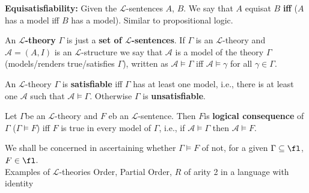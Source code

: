 \begin{definition}
	\textbf{Equisatisfiability:} Given the $\mathcal{L}$-sentences $A$, $B$. We say that $A$ equisat $B$ \textbf{iff} ($A$ has a model iff $B$ has a model). Similar to propositional logic.
\end{definition}

\begin{definition}
	An \textbf{$\mathcal{L}$-theory} $\Gamma$ is just a \textbf{set of $\mathcal{L}$-sentences}. If $\Gamma$ is an $\mathcal{L}$-theory and $\mathcal{A} = (A,I)$ is an $\mathcal{L}$-structure we say that $\mathcal{A}$ is a model of the theory $\Gamma$ (models/renders true/satisfies $\Gamma$), written as $\mathcal{A} \models \Gamma$ iff $\mathcal{A} \models \gamma$ for all $\gamma \in \Gamma$.
\end{definition}

\begin{definition}
	An $\mathcal{L}$-theory $\Gamma$ is \textbf{satisfiable} iff $\Gamma$ has at least one model, i.e., there is at least one $\mathcal{A}$ such that $\mathcal{A} \models \Gamma$. Otherwise $\Gamma$ is \textbf{unsatisfiable}.
\end{definition}

\begin{definition}
	Let $\Gamma$be an $\mathcal{L}$-theory and $F$ eb an $\mathcal{L}$-sentence. Then $F$is \textbf{logical consequence} of $\Gamma$ ($\Gamma \models F$) iff $F$ is true in every model of $\Gamma$, i.e., if $\mathcal{A} \models \Gamma$ then $\mathcal{A} \models F$.
\end{definition}

\noindent
We shall be concerned in ascertaining whether $\Gamma \models F$ of not, for a given $\Gamma \subseteq \fl$, $F \in \fl$.\\


Examples of $\mathcal{L}$-theories
Order, Partial Order, $R$ of arity 2 in a language with identity

